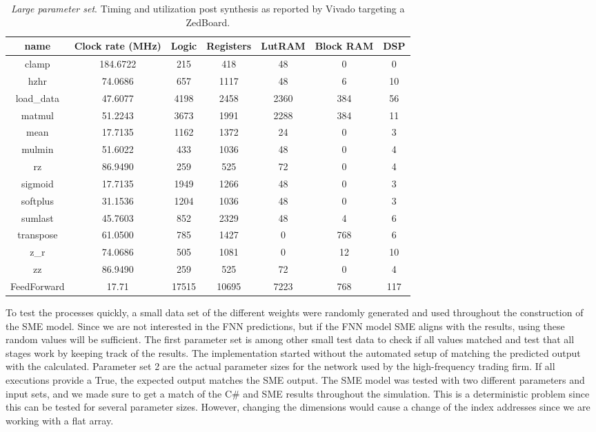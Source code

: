 \begin{table}
\centering
\begin{tabular}{||c c c c c c c||} 
 \hline
name & Clock rate (MHz) & Logic & Registers & LutRAM &  Block RAM & DSP  \\ [0.5ex] 
 \hline\hline
clamp & 184.6722 & 215 & 418 & 48 & 0 & 0\\
hzhr & 74.0686 & 657 & 1117 & 48 & 6 & 10\\
load\_data & 47.6077 & 4198 & 2458 & 2360 & 384 & 56\\
matmul & 51.2243 & 3673 & 1991 & 2288 & 384 & 11\\
mean & 17.7135 & 1162 & 1372 & 24 & 0 & 3\\
mulmin & 51.6022 & 433 & 1036 & 48 & 0 & 4\\
rz & 86.9490 & 259 & 525 & 72 & 0 & 4\\
sigmoid & 17.7135 & 1949 & 1266 & 48 & 0 & 3\\
softplus & 31.1536 & 1204 & 1036 & 48 & 0 & 3\\
sumlast & 45.7603 & 852 & 2329 & 48 & 4 & 6\\
transpose & 61.0500 & 785 & 1427 & 0 & 768 & 6\\
z\_r & 74.0686 & 505 & 1081 & 0 & 12 & 10\\
zz & 86.9490 & 259 & 525 & 72 & 0 & 4\\
FeedForward & 17.71 & 17515 & 10695 & 7223 & 768 & 117\\
 \hline
\end{tabular}
\caption{
\textit{Large parameter set}. Timing and utilization post synthesis as reported by Vivado targeting a ZedBoard.}
\label{table:utilization_acutal}
\end{table}

To test the processes quickly, a small data set of the different weights were randomly generated and used throughout the construction of the SME model. Since we are not interested in the FNN predictions, but if the FNN model SME aligns with the results, using these random values will be sufficient. The first parameter set is among other small test data to check if all values matched and test that all stages work by keeping track of the results. The implementation started without the automated setup of matching the predicted output with the calculated. Parameter set 2 are the actual parameter sizes for the network used by the high-frequency trading firm. If all executions provide a True, the expected output matches the SME output. The SME model was tested with two different parameters and input sets, and we made sure to get a match of the C\# and SME results throughout the simulation. This is a deterministic problem since this can be tested for several parameter sizes. However, changing the dimensions would cause a change of the index addresses since we are working with a flat array.  \\ 

